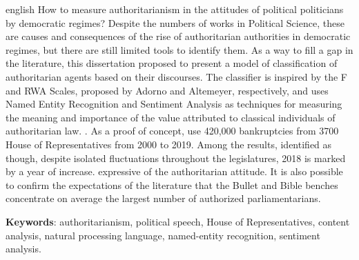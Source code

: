 \documentclass[
12pt,				%
openright,			%
twoside,			%
a4paper,			%
english,			%
french,				%
spanish,			%
brazil				%
]{abntex2}
\newcommand{\listofquadrosname}{Lista de quadros}
\begin{document}
\begin{resumo}[Abstract]
	\begin{otherlanguage*}{english}
		How to measure authoritarianism in the attitudes of political politicians by democratic regimes? Despite the numbers of works in Political Science, these are causes and consequences of the rise of authoritarian authorities in democratic regimes, but there are still limited tools to identify them. As a way to fill a gap in the literature, this dissertation proposed to present a model of classification of authoritarian agents based on their discourses. The classifier is inspired by the F and RWA Scales, proposed by Adorno and Altemeyer, respectively, and uses Named Entity Recognition and Sentiment Analysis as techniques for measuring the meaning and importance of the value attributed to classical individuals of authoritarian law. . As a proof of concept, use 420,000 bankruptcies from 3700 House of Representatives from 2000 to 2019. Among the results, identified as though, despite isolated fluctuations throughout the legislatures, 2018 is marked by a year of increase. expressive of the authoritarian attitude. It is also possible to confirm the expectations of the literature that the Bullet and Bible benches concentrate on average the largest number of authorized parliamentarians.
		
		\noindent 
		\textbf{Keywords}: authoritarianism, political speech, House of Representatives, content analysis, natural processing language, named-entity recognition, sentiment analysis.
	\end{otherlanguage*}
\end{resumo}
		
\listoffigures*
\cleardoublepage

\pdfbookmark[0]{\listofquadrosname}{loq}
\listofquadros*
\cleardoublepage

\listoftables*
\cleardoublepage

\tableofcontents*
\cleardoublepage



\textual
\end{document}
